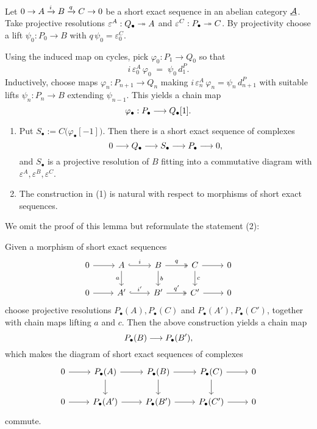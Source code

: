 Let \( 0 \to A \xrightarrow{i} B \xrightarrow{q} C \to 0 \) be a short exact sequence in an abelian category \( \underline{\mathcal A} \). Take projective resolutions \( \varepsilon^A: Q_\bullet \twoheadrightarrow A \) and \( \varepsilon^C: P_\bullet \twoheadrightarrow C \). By projectivity choose a lift \( \psi_0: P_0 \to B \) with \( q\,\psi_0 = \varepsilon^C_0 \).

Using the induced map on cycles, pick \( \varphi_0: P_1 \to Q_0 \) so that
\[
	i\, \varepsilon^A_0\, \varphi_0 \;=\; \psi_0\, d^{P}_1.
\]
Inductively, choose maps \( \varphi_n: P_{n+1} \to Q_n \) making \( i\, \varepsilon^A_n\, \varphi_n = \psi_n\, d^{P}_{n+1} \) with suitable lifts \( \psi_n: P_n \to B \) extending \( \psi_{n-1} \). This yields a chain map
\[
	\varphi_\bullet: P_\bullet \longrightarrow Q_\bullet[1].
\]

\begin{lemma*}
	\mbox{}
	\begin{enumerate}
		\item Put \( S_\bullet := C\bigl(\varphi_\bullet[-1]\bigr) \). Then there is a short exact sequence of complexes
			\[
				0 \longrightarrow Q_\bullet \longrightarrow S_\bullet \longrightarrow P_\bullet \longrightarrow 0,
			\]
			and \( S_\bullet \) is a projective resolution of \( B \) fitting into a commutative diagram with \( \varepsilon^A,\varepsilon^B,\varepsilon^C \).
		\item The construction in (1) is natural with respect to morphisms of short exact sequences.
	\end{enumerate}
\end{lemma*}

We omit the proof of this lemma but reformulate the statement (2):

\begin{lemma*}
	Given a morphism of short exact sequences
	\[
		\begin{tikzcd}
			0 \arrow[r] & A \arrow[r,hook,"i"] \arrow[d,"a"'] & B \arrow[r,two heads,"q"] \arrow[d,"b"] & C \arrow[r] \arrow[d,"c"] & 0 \\
			0 \arrow[r] & A' \arrow[r,hook,"i'"] & B' \arrow[r,two heads,"q'"] & C' \arrow[r] & 0
		\end{tikzcd}
	\]
	choose projective resolutions \( P_\bullet(A), P_\bullet(C) \) and \( P_\bullet(A'), P_\bullet(C') \), together with chain maps lifting \( a \) and \( c \). Then the above construction yields a chain map
	\[
		P_\bullet(B) \longrightarrow P_\bullet(B'),
	\]
	which makes the diagram of short exact sequences of complexes
	\[
		\begin{tikzcd}
			0 \arrow[r] & P_\bullet(A) \arrow[r] \arrow[d] & P_\bullet(B) \arrow[r] \arrow[d] & P_\bullet(C) \arrow[r] \arrow[d] & 0 \\
			0 \arrow[r] & P_\bullet(A') \arrow[r] & P_\bullet(B') \arrow[r] & P_\bullet(C') \arrow[r] & 0
		\end{tikzcd}
	\]
	commute.
\end{lemma*}

